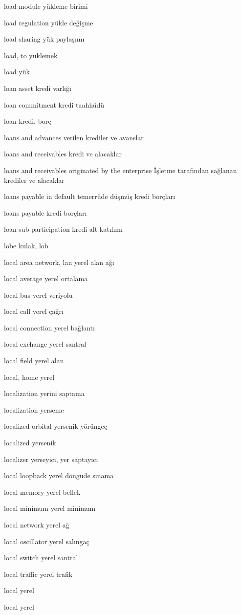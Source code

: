 \documentclass[12pt,fleqn]{article}\usepackage{../../common}
\begin{document}
load module yükleme birimi

load regulation yükle değişme

load sharing yük paylaşımı

load, to yüklemek

load yük

loan asset kredi varlığı

loan commitment kredi taahhüdü

loan kredi, borç

loans and advances verilen krediler ve avanslar

loans and receivables kredi ve alacaklar

loans and receivables originated by the enterprise İşletme tarafından sağlanan krediler ve alacaklar

loans payable in default temerrüde düşmüş kredi borçları

loans payable kredi borçları

loan sub-participation kredi alt katılımı

lobe kulak, lob

local area network, lan yerel alan ağı

local average yerel ortalama

local bus yerel veriyolu

local call yerel çağrı

local connection yerel bağlantı

local exchange yerel santral

local field yerel alan

local, home yerel

localization yerini saptama

localization yerseme

localized orbital yersenik yörüngeç

localized yersenik

localizer yerseyici, yer saptayıcı

local loopback yerel döngüde sınama

local memory yerel bellek

local minimum yerel minimum

local network yerel ağ

local oscillator yerel salıngaç

local switch yerel santral

local traffic yerel trafik

local yerel

local yerel
\end{document}
